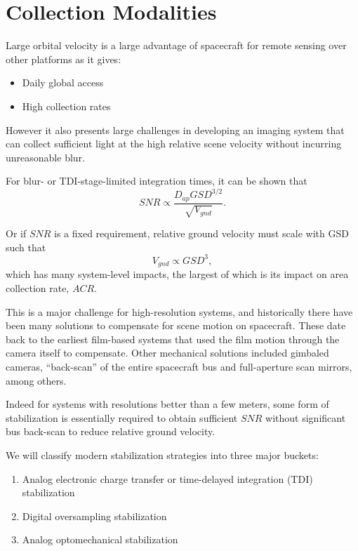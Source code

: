 \documentclass[10pt,journal]{IEEEtran}  %
\begin{document}
\section{Collection Modalities}
\label{sec:modalities}
Large orbital velocity is a large advantage of spacecraft for remote sensing over other platforms as it gives:


\begin{itemize}
\item Daily global access
\item High collection rates
\end{itemize}

However it also presents large challenges in developing an imaging system that can collect sufficient light at the high relative scene velocity without incurring unreasonable blur.

For blur- or TDI-stage-limited integration times, it can be shown that~\cite{shaw}
\begin{equation*}
    SNR \propto \frac{D_{ap} GSD^{3/2}}{\sqrt{V_{gnd}}}.
\end{equation*}

Or if $SNR$ is a fixed requirement, relative ground velocity must scale with GSD such that
\begin{equation}
V_{gnd} \propto GSD^3,
\end{equation}
which has many system-level impacts, the largest of which is its impact on area collection rate, $ACR$.

This is a major challenge for high-resolution systems, and historically there have been many solutions to compensate for scene motion on spacecraft.  These date back to the earliest film-based systems that used the film motion through the camera itself to compensate.  Other mechanical solutions included gimbaled cameras, ``back-scan'' of the entire spacecraft bus and full-aperture scan mirrors, among others.

Indeed for systems with resolutions better than a few meters, some form of stabilization is essentially required to obtain sufficient $SNR$ without significant bus back-scan to reduce relative ground velocity.

We will classify modern stabilization strategies into three major buckets:

\begin{enumerate}
\item Analog electronic charge transfer or time-delayed integration (TDI) stabilization
\item Digital oversampling stabilization
\item Analog optomechanical stabilization
\end{enumerate}
\end{document}
